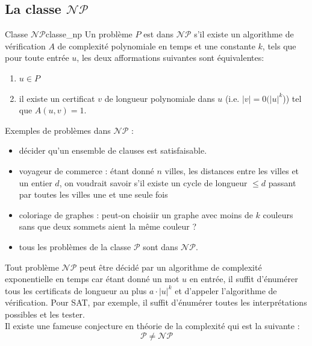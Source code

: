 \subsection{La classe $\mathcal{NP}$}
\label{sub:la_classe_np}
\begin{definition}{Classe $\mathcal{NP}$}{classe_np}
    Un problème $P$ est dans $\mathcal{NP}$ s'il existe un algorithme de vérification $A$ de complexité polynomiale en temps
    et une constante $k$, tels que pour toute entrée $u$, les deux afformations suivantes sont équivalentes:
    \begin{enumerate}
        \item $u\in P$
        \item il existe un certificat $v$ de longueur polynomiale dans $u$ (i.e. $|v| = 0(|u|^k$)) tel que $A(u,v)=1$.
    \end{enumerate}
\end{definition}
\begin{example}
    Exemples de problèmes dans $\mathcal{NP}$ :
    \begin{itemize}[label=\textbullet]
        \item décider qu'un ensemble de clauses est satisfaisable.
        \item voyageur de commerce : étant donné $n$ villes, les distances entre les villes et un entier $d$, on voudrait
        savoir s'il existe un cycle de longueur $\leq d$ passant par toutes les villes une et une seule fois
        \item coloriage de graphes : peut-on choisiir un graphe avec moins de $k$ couleurs sans que deux sommets aient la 
        même couleur ?
        \item tous les problèmes de la classe $\mathcal{P}$ sont dans $\mathcal{NP}$.
    \end{itemize}
\end{example}
Tout problème $\mathcal{NP}$ peut être décidé par un algorithme de complexité exponentielle en temps car étant donné un mot
$u$ en entrée, il suffit d'énumérer tous les certificats de longueur au plus $a\cdot|u|^k$ et d'appeler l'algorithme de 
vérification. Pour SAT, par exemple, il suffit d'énumérer toutes les interprétations possibles et les tester.\\
Il existe une fameuse conjecture en théorie de la complexité qui est la suivante : 
\begin{equation*}
    \mathcal{P}\neq\mathcal{NP}
\end{equation*}

